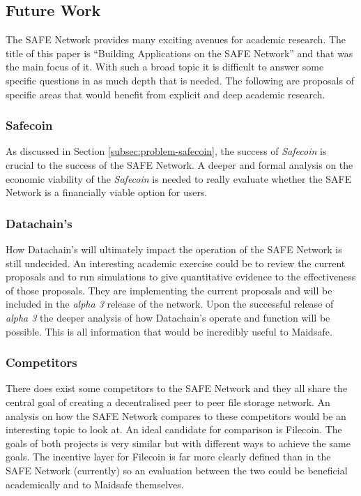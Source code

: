 \subsection{Future Work}

The SAFE Network provides many exciting avenues for academic research. The title of this paper is ``Building Applications on the SAFE Network'' and that was the main focus of it. With such a broad topic it is difficult to answer some specific questions in as much depth that is needed. The following are proposals of specific areas that would benefit from explicit  and deep academic research.

\subsubsection{Safecoin}

As discussed in Section \ref{subsec:problem-safecoin}, the success of \textit{Safecoin} is crucial to the success of the SAFE Network. A deeper and formal analysis on the economic viability of the \textit{Safecoin} is needed to really evaluate whether the SAFE Network is a financially viable option for users.

\subsubsection{Datachain's}

How Datachain's will ultimately impact the operation of the SAFE Network is still undecided. An interesting academic exercise could be to review the current proposals and to run simulations to give quantitative evidence to the effectiveness of those proposals. They are implementing the current proposals and will be included in the \textit{alpha 3} release of the network. Upon the successful release of \textit{alpha 3} the deeper analysis of how Datachain's operate and function will be possible. This is all information that would be incredibly useful to Maidsafe.

\subsubsection{Competitors}

There does exist some competitors to the SAFE Network and they all share the central goal of creating a decentralised peer to peer file storage network. An analysis on how the SAFE Network compares to these competitors would be an interesting topic to look at. An ideal candidate for comparison is Filecoin\cite{filecoin}. The goals of both projects is very similar but with different ways to achieve the same goals. The incentive layer for Filecoin is far more clearly defined than in the SAFE Network (currently) so an evaluation between the two could be beneficial academically and to Maidsafe themselves.




